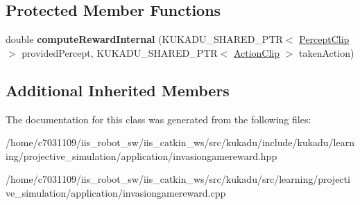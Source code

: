 \subsection*{Protected Member Functions}
\begin{DoxyCompactItemize}
\item 
\hypertarget{classkukadu_1_1InvasionGameReward_abe8b92de8b073852651facf9e2b2b29d}{double {\bfseries compute\-Reward\-Internal} (K\-U\-K\-A\-D\-U\-\_\-\-S\-H\-A\-R\-E\-D\-\_\-\-P\-T\-R$<$ \hyperlink{classkukadu_1_1PerceptClip}{Percept\-Clip} $>$ provided\-Percept, K\-U\-K\-A\-D\-U\-\_\-\-S\-H\-A\-R\-E\-D\-\_\-\-P\-T\-R$<$ \hyperlink{classkukadu_1_1ActionClip}{Action\-Clip} $>$ taken\-Action)}\label{classkukadu_1_1InvasionGameReward_abe8b92de8b073852651facf9e2b2b29d}

\end{DoxyCompactItemize}
\subsection*{Additional Inherited Members}


The documentation for this class was generated from the following files\-:\begin{DoxyCompactItemize}
\item 
/home/c7031109/iis\-\_\-robot\-\_\-sw/iis\-\_\-catkin\-\_\-ws/src/kukadu/include/kukadu/learning/projective\-\_\-simulation/application/invasiongamereward.\-hpp\item 
/home/c7031109/iis\-\_\-robot\-\_\-sw/iis\-\_\-catkin\-\_\-ws/src/kukadu/src/learning/projective\-\_\-simulation/application/invasiongamereward.\-cpp\end{DoxyCompactItemize}
